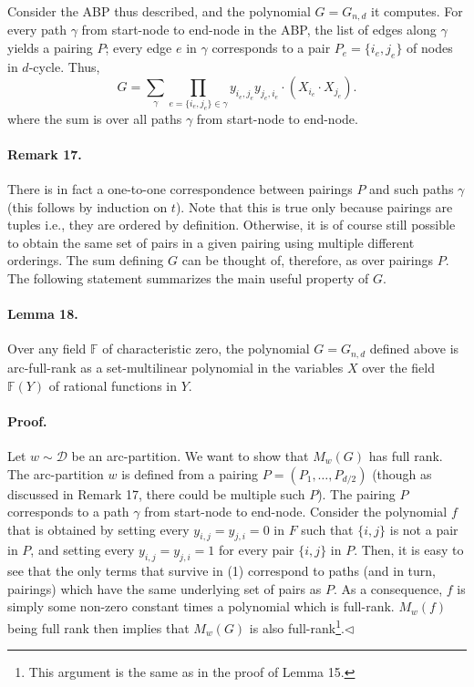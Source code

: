 \documentclass[10pt,a4paper]{article}
\begin{document}
Consider the ABP thus described, and the polynomial $G=G_{n,d}$ it computes. For every path $\gamma$ from start-node to end-node in the ABP, the list of edges along $\gamma$ yields a pairing $P$; every edge $e$ in $\gamma$ corresponds to a pair $P_e=\{i_e,j_e\}$ of nodes in $d$-cycle. Thus,
\[G=\sum_\gamma\prod_{e=\{i_e,j_e\}\in\gamma}y_{i_e,j_e}y_{j_e,i_e}\cdot(X_{i_e}\cdot X_{j_e}).\tag{1}\]
where the sum is over all paths $\gamma$ from start-node to end-node.
\paragraph{Remark 17.} There is in fact a one-to-one correspondence between pairings $P$ and such paths $\gamma$ (this follows by induction on $t$). Note that this is true only because pairings are tuples i.e., they are ordered by definition. Otherwise, it is of course still possible to obtain the same set of pairs in a given pairing using multiple different orderings. The sum defining $G$ can be thought of, therefore, as over pairings $P$.
The following statement summarizes the main useful property of $G$.
\paragraph{Lemma 18.} Over any field $\mathbb F$ of characteristic zero, the polynomial $G=G_{n,d}$ defined above is arc-full-rank as a set-multilinear polynomial in the variables $X$ over the field $\mathbb F(Y)$ of rational functions in $Y$.
\paragraph{Proof.} Let $w\sim\mathcal D$ be an arc-partition. We want to show that $M_w(G)$ has full rank. The arc-partition $w$ is defined from a pairing $P=(P_1,\ldots,P_{d/2})$ (though as discussed in Remark 17, there could be multiple such $P$). The pairing $P$ corresponds to a path $\gamma$ from start-node to end-node. Consider the polynomial $f$ that is obtained by setting every $y_{i,j}=y_{j,i}=0$ in $F$ such that $\{i,j\}$ is not a pair in $P$, and setting every $y_{i,j}=y_{j,i}=1$ for every pair $\{i,j\}$ in $P$. Then, it is easy to see that the only terms that survive in (1) correspond to paths (and in turn, pairings) which have the same underlying set of pairs as $P$. As a consequence, $f$ is simply some non-zero constant times a polynomial which is full-rank. $M_w(f)$ being full rank then implies that $M_w(G)$ is also full-rank\footnote{This argument is the same as in the proof of Lemma 15.}.\hfill$\triangleleft$
\end{document}
